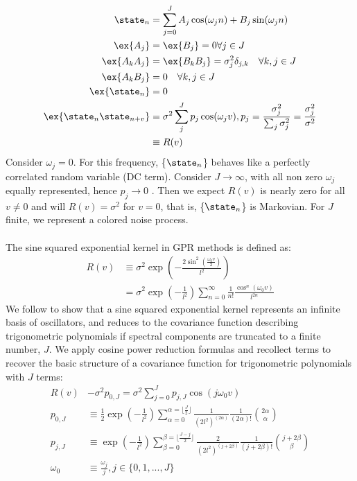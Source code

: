 \begin{align}
\state_n &= \sum_{j=0}^{J} A_j \cos(\omega_j n) + B_j \sin(\omega_j n) \label{eqn:E_f_nrigpolynomial} \\
\ex{A_j} & = \ex{B_j} =0 \forall j \in J \\
\ex{A_k A_j} &= \ex{B_k B_j} = \sigma_j^2 \delta_{j,k} \quad \forall k,j \in J\\
\ex{A_k B_j} &= 0 \quad  \forall k,j \in J \label{eqn:karlin_nrig_cross} \\
 \ex{\state_n} &= 0 \\
 \ex{\state_n \state_{n+v}} &= \sigma^2 \sum_j^{J}  p_j \cos(\omega_jv), p_j = \frac{\sigma_j^2}{\sum_j \sigma_j^2} = \frac{\sigma_j^2}{\sigma^2}\\
&\equiv R(v)
\end{align}
Consider $\omega_j =0$. For this frequency, \{$\state_n$\} behaves like a perfectly correlated random variable (DC term). Consider $J \to \infty$, with all non zero $\omega_j$ equally represented, hence $p_j \to 0$ . Then we expect $R(v)$ is nearly zero for all $v\neq 0$ and will $R(v)=\sigma^2$ for $v=0$, that is, \{$\state_n$\} is Markovian. For $J$ finite, we represent a colored noise process.
\\
\\
The sine squared exponential kernel in GPR methods is defined as:
\begin{align}
R(v) &\equiv \sigma^2 \exp (- \frac{2\sin^2(\frac{\omega_0 v}{2})}{l^2}) \\
 &=  \sigma^2 \exp (- \frac{1}{l^2}) \sum_{n = 0}^{\infty} \frac{1}{n!} \frac{\cos^n(\omega_0 v)}{l^{2n}} 
\end{align}
We follow \cite{solin2014} to  show that a sine squared exponential kernel represents an infinite basis of oscillators, and reduces to the covariance function describing trigonometric polynomials if spectral components are truncated to a finite number, $J$. We apply cosine power reduction formulas and recollect terms to recover the basic structure of a covariance function for trigonometric polynomials with $J$ terms:
\begin{align}
R(v) &- \sigma^2 p_{0,J}  = \sigma^2 \sum_{j=0}^{J} p_{j,J} \cos(j\omega_0 v)\\
p_{0,J} & \equiv \frac{1}{2} \exp (- \frac{1}{l^2}) \sum_{\alpha = 0}^{\alpha = \lfloor\frac{J}{2}\rfloor} \frac{1}{(2l^2)^{(2\alpha)}} \frac{1}{(2\alpha)!} \binom{2\alpha}{\alpha} \label{eqn:p0J}\\
p_{j,J} & \equiv \exp (- \frac{1}{l^2}) \sum_{\beta = 0}^{\beta = \lfloor\frac{J-j}{2}\rfloor} \frac{2}{(2l^2)^{(j + 2\beta)}} \frac{1}{(j + 2\beta)!} \binom{j + 2\beta}{\beta} \label{eqn:pjJ} \\
\omega_0 &\equiv \frac{\omega_j}{j}, j \in \{0, 1,..., J\} 
\end{align}
